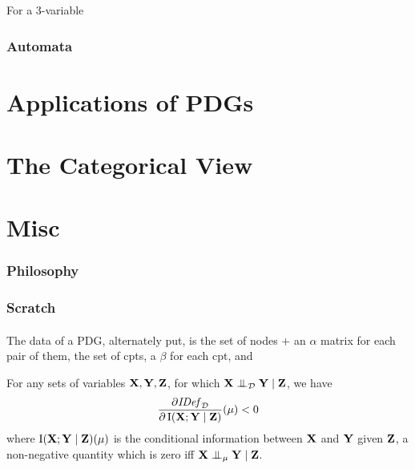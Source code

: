 \documentclass{article}
\begin{document}
    \begin{example}
        For a 3-variable
    \end{example}
	


	
	
	
	\section{Automata}
	
	\part{Applications of PDGs}
	\part{The Categorical View}

	\part{Misc}
	\section{Philosophy}
	\section{Scratch}
	
	\begin{inactive}
		\subsection{}
		The data of a PDG, alternately put, is the set of nodes + an $\alpha$ matrix for each pair of them, the set of cpts, a $\beta$ for each cpt, and 
		
		\begin{prop}
			For any sets of variables $\mathbf X, \mathbf Y, \mathbf Z$, for which $\mathbf X \mathrel{\perp\mspace{-10mu}\perp}_{\mathcal D} \mathbf Y \mid \mathbf Z$, we have
			\[ \frac{\partial \mathit{IDef}_{\cal D}}{\partial \operatorname{\mathrm{I}}(\mathbf X; \mathbf Y \mid \mathbf Z)}(\mu) < 0 \]
			where $\operatorname{\mathrm{I}}(\mathbf X; \mathbf Y \mid \mathbf Z)(\mu)$ is the conditional information between $\mathbf X$ and $\mathbf Y$ given $\mathbf Z$, a non-negative quantity which is zero iff $\mathbf X \mathrel{\perp\mspace{-10mu}\perp}_{\mu} \mathbf Y \mid \mathbf Z$. 
		\end{prop}
	\end{inactive}
\end{document}
